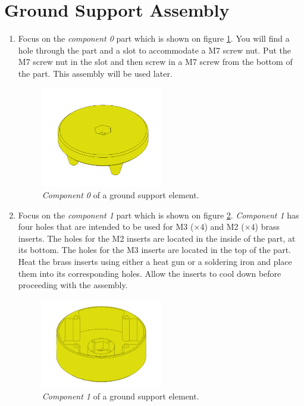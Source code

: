 \documentclass{article}
\begin{document}
\section{Ground Support Assembly}
\begin{enumerate}
    \item Focus on the \textit{component 0} part which is shown on figure \ref{fig:gs_step_1}. You will find a hole through the part and a slot to accommodate a M7 screw nut. Put the M7 screw nut in the slot and then screw in a M7 screw from the bottom of the part. This assembly will be used later.
    
    \begin{figure}[H]
        \centering
        \includegraphics[width=0.5\textwidth]{images/ground/step_A.png}
        \caption{\textit{Component 0} of a ground support element.}
        \label{fig:gs_step_1}
    \end{figure}
    
    \item Focus on the \textit{component 1} part which is shown on figure \ref{fig:gs_step_2}. \textit{Component 1} has four holes that are intended to be used for M3 ($\times 4$) and M2 ($\times 4$) brass inserts. The holes for the M2 inserts are located in the inside of the part, at its bottom. The holes for the M3 inserts are located in the top of the part. Heat the brass inserts using either a heat gun or a soldering iron and place them into its corresponding holes. Allow the inserts to cool down before proceeding with the assembly.
    
    \begin{figure}[H]
        \centering
        \includegraphics[width=0.5\textwidth]{images/ground/step_B.png}
        \caption{\textit{Component 1} of a ground support element.}
        \label{fig:gs_step_2}
    \end{figure}
    

\end{enumerate}
\end{document}
